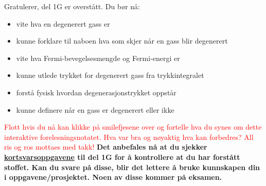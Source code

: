 \documentclass{beamer}
\let\hrefori\href
\renewcommand{\href}[2]{{\setlength{\fboxsep}{1pt}\colorbox{sunset}{\hrefori{#1}{#2}}}}
\newcommand{\pagebutton}[1]{\setbeamertemplate{button}{\tikz\node[inner xsep = 5pt, draw = structure!90, fill = green(ryb), rounded corners = 8pt]{\color{amber}\Large\insertbuttontext};}\beamerbutton{#1}}
\begin{document}
\begin{frame}
\label{oppsummering}
\hyperlink{prom24}{\pagebutton{\small Forrige side}}\href{https://nettskjema.no/a/162264}{ \Changey[1][yellow]{-2}}
Gratulerer, del 1G er overstått. Du bør nå:
\begin{itemize}
\item vite hva en degenerert gass er
\item kunne forklare til naboen hva som skjer når en gass blir degenerert
\item vite hva Fermi-bevegelsesmengde og Fermi-energi er
\item kunne utlede trykket for degenerert gass fra trykkintegralet
\item forstå fysisk hvordan degenerasjonstrykket oppstår
\item kunne definere når en gass er degenerert eller ikke
\end{itemize}
\textcolor{red}{Flott hvis du nå kan klikke på smilefjesene over og fortelle hva du synes om dette interaktive forelesningsnotatet. Hva var bra og nøyaktig hva kan forbedres? All ris og ros mottaes med takk!}
{\bf Det anbefales nå at du sjekker \href{https://www.uio.no/studier/emner/matnat/astro/AST2000/h21/undervisningsmateriell/kortsvarsoppgaver/del1g.pdf}{kortsvarsoppgavene} til del 1G for å kontrollere at du har forstått stoffet. Kan du svare på disse, blir det lettere å bruke kunnskapen din i oppgavene/prosjektet. Noen av disse kommer på eksamen.}
\end{frame}
\end{document}
